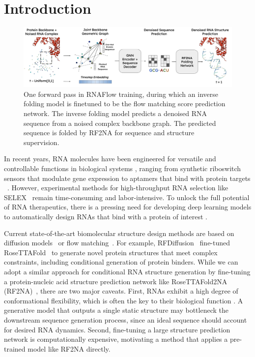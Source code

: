 \section{Introduction}

\begin{figure}[ht]
    \centering
    \includegraphics[width=2\columnwidth]{if-flow-match.png}
    \caption{One forward pass in RNAFlow training, during which an inverse folding model is finetuned to be the flow matching score prediction network. The inverse folding model predicts a denoised RNA sequence from a noised complex backbone graph. The predicted sequence is folded by RF2NA for sequence and structure supervision.}
    \label{fig:1}
\end{figure}

In recent years, RNA molecules have been engineered for versatile and controllable functions in biological systems \cite{dykstra2022engineering}, ranging from synthetic riboswitch sensors that modulate gene expression to aptamers that bind with protein targets ~\cite{thavarajah2021rna, vezeau2023automated, keefe2010aptamers}. However, experimental methods for high-throughput RNA selection like SELEX~\cite{gold2015selex} remain time-consuming and labor-intensive. To unlock the full potential of RNA therapeutics, there is a pressing need for developing deep learning models to automatically design RNAs that bind with a protein of interest \cite{sanchez2019rna}.

Current state-of-the-art biomolecular structure design methods are based on diffusion models~\cite{ho2020denoising,yim2023se} or flow matching~\cite{lipman2022flow,bose2023se}. For example, RFDiffusion~\cite{watson2023novo} fine-tuned RoseTTAFold~\cite{baek2021accurate} to generate novel protein structures that meet complex constraints, including conditional generation of protein binders. While we can adopt a similar approach for conditional RNA structure generation by fine-tuning a protein-nucleic acid structure prediction network like RoseTTAFold2NA (RF2NA)~\cite{baek2023accurate}, there are two major caveats. First, RNAs exhibit a high degree of conformational flexibility, which is often the key to their biological function \cite{ganser2019roles}. A generative model that outputs a single static structure may bottleneck the downstream sequence generation process, since an ideal sequence should account for desired RNA dynamics. Second, fine-tuning a large structure prediction network is computationally expensive, motivating a method that applies a pre-trained model like RF2NA directly. 

